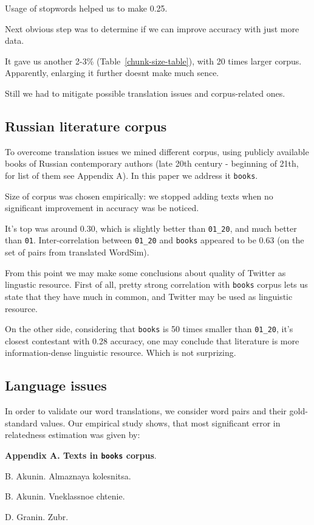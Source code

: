 \documentclass[11pt,letterpaper]{article}
\begin{document}
Usage of stopwords helped us to make 0.25. 

Next obvious step was to determine if we can improve accuracy with just more data.

It gave us another 2-3\% (Table~\ref{chunk-size-table}), with 20 times larger
corpus. Apparently, enlarging it further doesnt make much sence.

Still we had to mitigate possible translation issues and corpus-related ones.

\subsection{Russian literature corpus}

To overcome translation issues we mined different corpus, using publicly 
available books of Russian contemporary authors (late 20th century - beginning
of 21th, for list of them see Appendix A). In this paper we address it 
{\tt books}.

Size of corpus was chosen empirically: we stopped adding texts when 
no significant improvement in accuracy was be noticed.

It's top was around 0.30, which is slightly better than {\tt 01\_20}, 
and much better than {\tt 01}. Inter-correlation between {\tt 01\_20} 
and {\tt books} appeared to be 0.63 (on the set of pairs
from translated WordSim).

From this point we may make some conclusions about quality of 
Twitter as lingustic resource. First of all, pretty strong correlation
with {\tt books} corpus lets us state that they have much in common, and
Twitter may be used as linguistic resource. 

On the other side, considering that {\tt books} is 50
times smaller than {\tt 01\_20}, it's closest contestant with 0.28 accuracy, 
one may conclude that literature is more information-dense linguistic resource.
Which is not surprizing.

\subsection{Language issues}

In order to validate our word translations, we consider word pairs 
and their gold-standard values. Our empirical study shows, that most
significant error in relatedness estimation was given by:







{\bf Appendix A. Texts in {\tt books} corpus}.
\label{books-app}

B. Akunin. Almaznaya kolesnitsa. 

B. Akunin. Vneklassnoe chtenie.

D. Granin. Zubr. 
\end{document}
